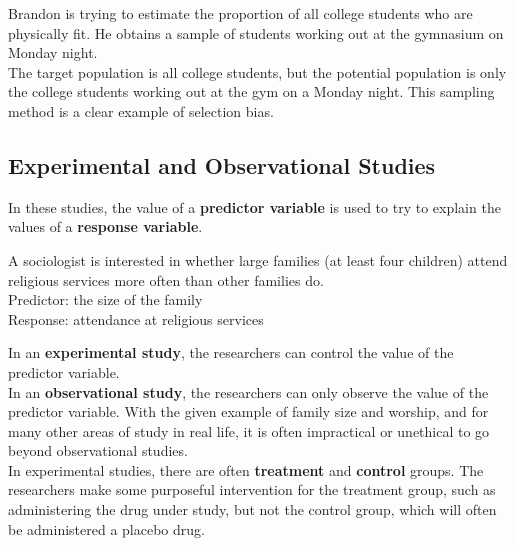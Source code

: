 \documentclass[12pt,openany]{book}
\begin{document}
	\begin{tcolorbox}[width=\textwidth,colback={green!10},title={\textbf{Example: Exercise 27}},colbacktitle={green!10},coltitle=black]
		Brandon is trying to estimate the proportion of all college students who are physically fit. He obtains a sample of students working out at the gymnasium on Monday night.\\

		The target population is all college students, but the potential population is only the college students working out at the gym on a Monday night. This sampling method is a clear example of selection bias.
	\end{tcolorbox}

	\subsection{Experimental and Observational Studies}

	\noindent In these studies, the value of a \textbf{predictor variable} is used to try to explain the values of a \textbf{response variable}.

	\begin{tcolorbox}[width=\textwidth,colback={green!10},title={\textbf{Example: Exercise 35}},colbacktitle={green!10},coltitle=black]
		A sociologist is interested in whether large families (at least four children) attend religious services more often than other families do.\\

		Predictor: the size of the family\\

		Response: attendance at religious services
	\end{tcolorbox}

	\noindent In an \textbf{experimental study}, the researchers can control the value of the predictor variable.\\

	\noindent In an \textbf{observational study}, the researchers can only observe the value of the predictor variable. With the given example of family size and worship, and for many other areas of study in real life, it is often impractical or unethical to go beyond observational studies.\\

	\noindent In experimental studies, there are often \textbf{treatment} and \textbf{control} groups. The researchers make some purposeful intervention for the treatment group, such as administering the drug under study, but not the control group, which will often be administered a placebo drug.\\
\end{document}
